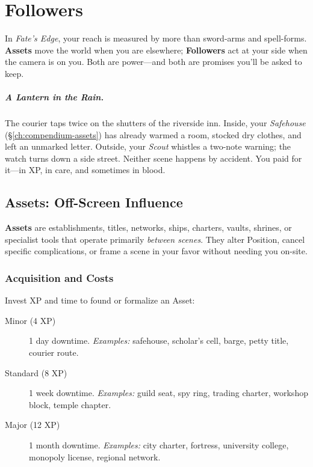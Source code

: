 \chapter{Followers}
\label{ch:followers}

In \textit{Fate's Edge}, your reach is measured by more than sword-arms and spell-forms. \textbf{Assets} move the world when you are elsewhere; \textbf{Followers} act at your side when the camera is on you. Both are power—and both are promises you'll be asked to keep.

\paragraph{A Lantern in the Rain.}
The courier taps twice on the shutters of the riverside inn. Inside, your \emph{Safehouse} (\S\ref{ch:compendium-assets}) has already warmed a room, stocked dry clothes, and left an unmarked letter. Outside, your \emph{Scout} whistles a two-note warning; the watch turns down a side street. Neither scene happens by accident. You paid for it—in XP, in care, and sometimes in blood.

\section{Assets: Off-Screen Influence}

\textbf{Assets} are establishments, titles, networks, ships, charters, vaults, shrines, or specialist tools that operate primarily \emph{between scenes}. They alter Position, cancel specific complications, or frame a scene in your favor without needing you on-site.

\subsection*{Acquisition and Costs}
Invest XP and time to found or formalize an Asset:
\begin{description}
  \item[Minor (4 XP)]  1 day downtime. \emph{Examples:} safehouse, scholar's cell, barge, petty title, courier route.
  \item[Standard (8 XP)]  1 week downtime. \emph{Examples:} guild seat, spy ring, trading charter, workshop block, temple chapter.
  \item[Major (12 XP)]  1 month downtime. \emph{Examples:} city charter, fortress, university college, monopoly license, regional network.
\end{description}

